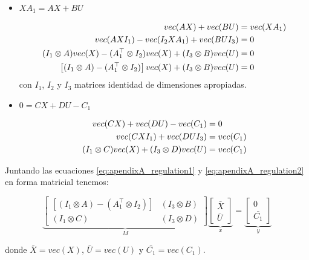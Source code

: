 \begin{itemize}
    \item $ X A_1 = A X + B U $
    
    \begin{align} \label{eq:apendixA_regulation1}
        vec(A X) + vec(B U) & = vec(X A_1) \notag \\
        vec(A X I_1) - vec(I_2 X A_1) + vec(B U I_3) & = 0 \notag \\
        (I_1\otimes A) vec(X) - (A_1^\top \otimes I_2) vec(X) + (I_3 \otimes B) vec(U) & = 0 \notag \\
        \left[(I_1\otimes A) - (A_1^\top \otimes I_2)\right] vec(X) + (I_3 \otimes B) vec(U) & = 0
    \end{align}
    con $I_1$, $I_2$ y $I_3$ matrices identidad de dimensiones apropiadas.

    \newpage
    \item $0 = C X + D U - C_1$

    \begin{align} \label{eq:apendixA_regulation2}
        vec(CX) + vec(DU) - vec(C_1) & = 0 \notag \\
        vec(C X I_1) + vec(D U I_3) & = vec(C_1) \notag \\
        (I_1 \otimes C) vec(X) + (I_3 \otimes D) vec(U) & = vec(C_1)
    \end{align}
\end{itemize}

Juntando las ecuaciones \ref{eq:apendixA_regulation1} y \ref{eq:apendixA_regulation2} en forma matricial tenemos:

\begin{equation}
    \underbrace{\begin{bmatrix}
        \left[(I_1\otimes A) - (A_1^\top \otimes I_2)\right] & (I_3 \otimes B) \\ (I_1 \otimes C) & (I_3 \otimes D)
    \end{bmatrix}}_{M}
    \underbrace{\begin{bmatrix}
        \bar{X} \\ \bar{U}    
    \end{bmatrix}}_{x} = 
    \underbrace{\begin{bmatrix}
        0 \\ \bar{C_1}
    \end{bmatrix}}_{y}
\end{equation}

donde $\bar{X}=vec(X)$, $\bar{U}=vec(U)$  y $\bar{C_1}=vec(C_1)$.

